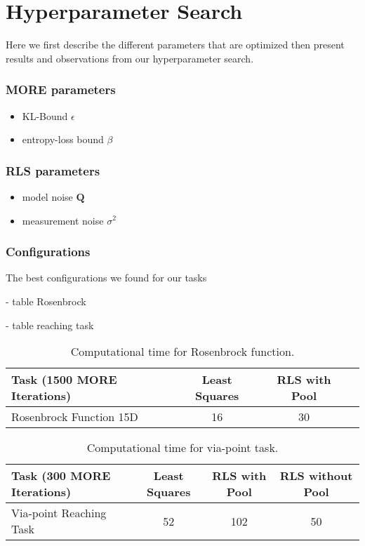 \section{Hyperparameter Search}
\label{appendix:par_search}
Here we first describe the different parameters
that are optimized
then present results and observations from
our hyperparameter search.

\subsubsection{MORE parameters}
\begin{itemize}
\item KL-Bound $\epsilon$
\item entropy-loss bound $\beta$
\end{itemize}
\subsubsection{RLS parameters}
\begin{itemize}
\item model noise $\mathbf{Q}$
\item measurement noise $\sigma^2$
\end{itemize}

\subsubsection{Configurations}
The best configurations we found for our tasks

- table Rosenbrock

- table reaching task

\begin{table}[htp]
  \centering
  \begin{tabular}{lccc} \toprule
    Task (1500 MORE Iterations)
    & Least Squares & RLS with Pool \\ \midrule
    Rosenbrock Function 15D & 16 & 30 \\ \bottomrule
  \end{tabular}
  \caption{
    Computational time for Rosenbrock function.
  }
  \label{tab:table}
\end{table}

\begin{table}[htp]
  \centering
  \begin{tabular}{lccc} \toprule
    Task (300 MORE Iterations)
    & Least Squares & RLS with Pool & RLS without Pool  \\ \midrule
    Via-point Reaching Task & 52 & 102 & 50 \\ \bottomrule
  \end{tabular}
  \caption{
    Computational time for via-point task.
  }
  \label{tab:table}
\end{table}

